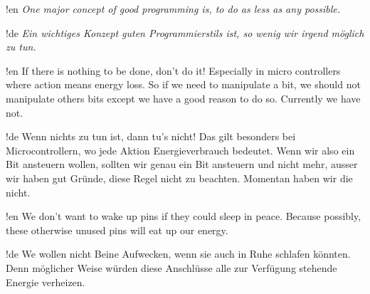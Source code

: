 !en \emph{One major concept of good programming is, to do as less as any possible.}

!de \emph{Ein wichtiges Konzept guten Programmierstils ist, so wenig wir irgend möglich zu tun.}



!en If there is nothing to be done, don't do it! Especially in micro controllers where action means energy loss. So if we need to manipulate a bit, we should not manipulate others bits except we have a good reason to do so. Currently we have not.

!de Wenn nichts zu tun ist, dann tu's nicht! Das gilt besonders bei Microcontrollern, wo jede Aktion Energieverbrauch bedeutet. Wenn wir also ein Bit ansteuern wollen, sollten wir genau ein Bit ansteuern und nicht mehr, ausser wir haben gut Gründe, diese Regel nicht zu beachten. Momentan haben wir die nicht.



!en We don't want to wake up pins if they could sleep in peace. Because possibly, these otherwise unused pins will eat up our energy.

!de We wollen nicht Beine Aufwecken, wenn sie auch in Ruhe schlafen könnten. Denn möglicher Weise würden diese Anschlüsse alle zur Verfügung stehende Energie verheizen.

